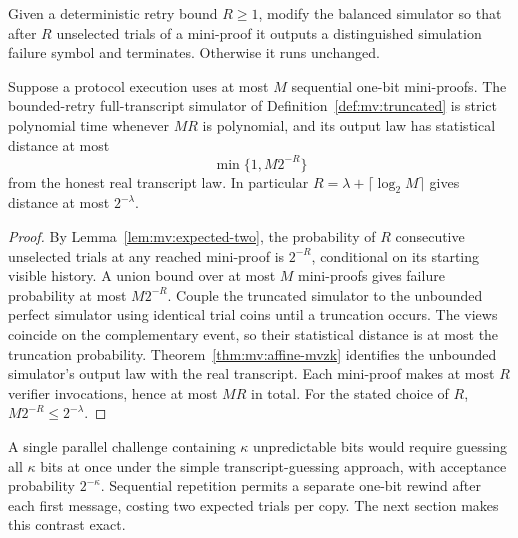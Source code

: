 \begin{definition}\label{def:mv:truncated}
Given a deterministic retry bound $R\ge1$,
modify the balanced simulator so that
after $R$ unselected trials of a mini-proof
it outputs a distinguished simulation
failure symbol and terminates.
Otherwise it runs unchanged.
\end{definition}

\begin{theorem}\label{thm:mv:truncated}
Suppose a protocol execution uses at most
$M$ sequential one-bit mini-proofs.
The bounded-retry full-transcript simulator
of Definition~\ref{def:mv:truncated}
is strict polynomial time whenever $MR$
is polynomial, and its output law has
statistical distance at most
\[
 \boxed{\min\{1,M2^{-R}\}}
\]
from the honest real transcript law.
In particular $R=\lambda+\lceil\log_2M\rceil$
gives distance at most $2^{-\lambda}$.
\end{theorem}
\begin{proof}
By Lemma~\ref{lem:mv:expected-two},
the probability of $R$ consecutive
unselected trials at any reached
mini-proof is $2^{-R}$, conditional
on its starting visible history.
A union bound over at most $M$
mini-proofs gives failure probability
at most $M2^{-R}$.
Couple the truncated simulator to
the unbounded perfect simulator
using identical trial coins until
a truncation occurs. The views
coincide on the complementary event,
so their statistical distance is
at most the truncation probability.
Theorem~\ref{thm:mv:affine-mvzk}
identifies the unbounded simulator's
output law with the real transcript.
Each mini-proof makes at most
$R$ verifier invocations, hence
at most $MR$ in total.
For the stated choice of $R$,
$M2^{-R}\le 2^{-\lambda}$.
\end{proof}

\begin{remark}
A single parallel challenge containing
$\kappa$ unpredictable bits would require
guessing all $\kappa$ bits at once under the
simple transcript-guessing approach,
with acceptance probability $2^{-\kappa}$.
Sequential repetition permits a separate
one-bit rewind after each first message,
costing two expected trials per copy.
The next section makes this contrast exact.
\end{remark}
